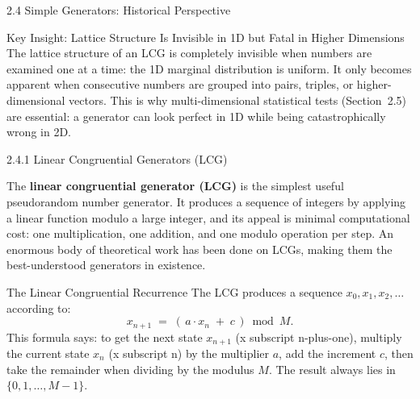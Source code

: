 \documentclass[aspectratio=169,10pt]{beamer}
\begin{document}
\begin{frame}[allowframebreaks]{2.4 Simple Generators: Historical Perspective}
\begin{alertblock}{Key Insight: Lattice Structure Is Invisible in 1D but Fatal in Higher Dimensions}
The lattice structure of an LCG is completely invisible when numbers are
examined one at a time: the 1D marginal distribution is uniform.  It only
becomes apparent when consecutive numbers are grouped into pairs, triples,
or higher-dimensional vectors.  This is why multi-dimensional statistical
tests (Section~2.5) are essential: a generator can look perfect in 1D while
being catastrophically wrong in 2D.
\end{alertblock}

\end{frame}

\begin{frame}[allowframebreaks]{2.4.1 Linear Congruential Generators (LCG)}

The \textbf{linear congruential generator (LCG)} is the simplest useful
pseudorandom number generator.  It produces a sequence of integers by
applying a linear function modulo a large integer, and its appeal is
minimal computational cost: one multiplication, one addition, and one
modulo operation per step.  An enormous body of theoretical work has been
done on LCGs, making them the best-understood generators in existence.

\begin{block}{The Linear Congruential Recurrence}
The LCG produces a sequence $x_0, x_1, x_2, \ldots$ according to:
\[
  x_{n+1} \;=\; (\,a \cdot x_n \;+\; c\,) \bmod M.
\]
This formula says: to get the next state $x_{n+1}$ (x subscript n-plus-one),
multiply the current state $x_n$ (x subscript n) by the multiplier $a$,
add the increment $c$, then take the remainder when dividing by the
modulus $M$.  The result always lies in $\{0, 1, \ldots, M-1\}$.
\end{block}


\end{frame}
\end{document}
